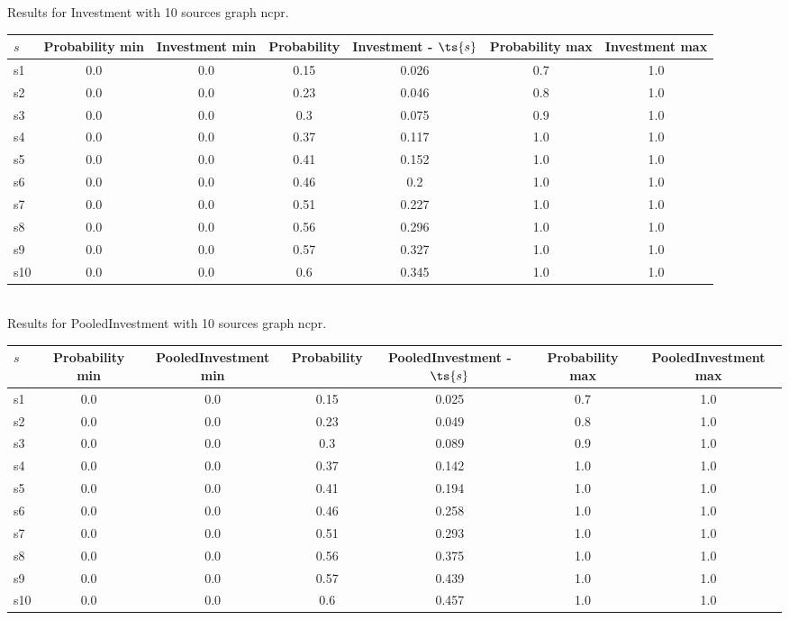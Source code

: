 \documentclass{article}
\begin{document}
\noindent Results for Investment with 10 sources graph ncpr.

\noindent\begin{tabular}{|l|c|c|c|c|c|c|}
\hline
$s$& Probability min & Investment min & Probability & Investment - $\ts{s}$ & Probability max & Investment max\\
\hline
s1 &0.0 & 0.0 & 0.15 & 0.026 & 0.7 & 1.0\\
\hline
s2 &0.0 & 0.0 & 0.23 & 0.046 & 0.8 & 1.0\\
\hline
s3 &0.0 & 0.0 & 0.3 & 0.075 & 0.9 & 1.0\\
\hline
s4 &0.0 & 0.0 & 0.37 & 0.117 & 1.0 & 1.0\\
\hline
s5 &0.0 & 0.0 & 0.41 & 0.152 & 1.0 & 1.0\\
\hline
s6 &0.0 & 0.0 & 0.46 & 0.2 & 1.0 & 1.0\\
\hline
s7 &0.0 & 0.0 & 0.51 & 0.227 & 1.0 & 1.0\\
\hline
s8 &0.0 & 0.0 & 0.56 & 0.296 & 1.0 & 1.0\\
\hline
s9 &0.0 & 0.0 & 0.57 & 0.327 & 1.0 & 1.0\\
\hline
s10 &0.0 & 0.0 & 0.6 & 0.345 & 1.0 & 1.0\\
\hline
\end{tabular}\\

\noindent Results for PooledInvestment with 10 sources graph ncpr.

\noindent\begin{tabular}{|l|c|c|c|c|c|c|}
\hline
$s$& Probability min & PooledInvestment min & Probability & PooledInvestment - $\ts{s}$ & Probability max & PooledInvestment max\\
\hline
s1 &0.0 & 0.0 & 0.15 & 0.025 & 0.7 & 1.0\\
\hline
s2 &0.0 & 0.0 & 0.23 & 0.049 & 0.8 & 1.0\\
\hline
s3 &0.0 & 0.0 & 0.3 & 0.089 & 0.9 & 1.0\\
\hline
s4 &0.0 & 0.0 & 0.37 & 0.142 & 1.0 & 1.0\\
\hline
s5 &0.0 & 0.0 & 0.41 & 0.194 & 1.0 & 1.0\\
\hline
s6 &0.0 & 0.0 & 0.46 & 0.258 & 1.0 & 1.0\\
\hline
s7 &0.0 & 0.0 & 0.51 & 0.293 & 1.0 & 1.0\\
\hline
s8 &0.0 & 0.0 & 0.56 & 0.375 & 1.0 & 1.0\\
\hline
s9 &0.0 & 0.0 & 0.57 & 0.439 & 1.0 & 1.0\\
\hline
s10 &0.0 & 0.0 & 0.6 & 0.457 & 1.0 & 1.0\\
\hline
\end{tabular}\\
\end{document}
